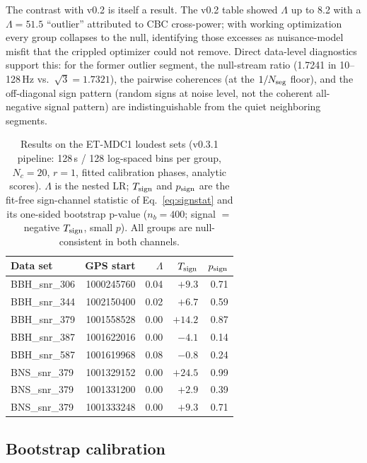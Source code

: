 \documentclass[11pt]{article}
\begin{document}
The contrast with v0.2 is itself a result. The v0.2 table showed $\Lambda$ up to 8.2 with a $\Lambda = 51.5$ ``outlier'' attributed to CBC cross-power; with working optimization every group collapses to the null, identifying those excesses as nuisance-model misfit that the crippled optimizer could not remove. Direct data-level diagnostics support this: for the former outlier segment, the null-stream ratio (1.7241 in 10--128\,Hz vs.\ $\sqrt3 = 1.7321$), the pairwise coherences (at the $1/N_{\rm seg}$ floor), and the off-diagonal sign pattern (random signs at noise level, not the coherent all-negative signal pattern) are indistinguishable from the quiet neighboring segments.

\begin{table}[t]
\centering
\caption{Results on the ET-MDC1 loudest sets (v0.3.1 pipeline: 128\,s / 128 log-spaced bins per group, $N_c = 20$, $r = 1$, fitted calibration phases, analytic scores). $\Lambda$ is the nested LR; $T_{\rm sign}$ and $p_{\rm sign}$ are the fit-free sign-channel statistic of Eq.~\eqref{eq:signstat} and its one-sided bootstrap p-value ($n_b = 400$; signal $=$ negative $T_{\rm sign}$, small $p$). All groups are null-consistent in both channels.}
\label{tab:groups}
\begin{tabular}{lrrrr}
\toprule
Data set & GPS start & $\Lambda$ & $T_{\rm sign}$ & $p_{\rm sign}$ \\
\midrule
BBH\_snr\_306 & 1000245760 & 0.04 & $+9.3$ & 0.71 \\
BBH\_snr\_344 & 1002150400 & 0.02 & $+6.7$ & 0.59 \\
BBH\_snr\_379 & 1001558528 & 0.00 & $+14.2$ & 0.87 \\
BBH\_snr\_387 & 1001622016 & 0.00 & $-4.1$ & 0.14 \\
BBH\_snr\_587 & 1001619968 & 0.08 & $-0.8$ & 0.24 \\
BNS\_snr\_379 & 1001329152 & 0.00 & $+24.5$ & 0.99 \\
BNS\_snr\_379 & 1001331200 & 0.00 & $+2.9$ & 0.39 \\
BNS\_snr\_379 & 1001333248 & 0.00 & $+9.3$ & 0.71 \\
\bottomrule
\end{tabular}
\end{table}

\subsection{Bootstrap calibration}
\label{sec:bootres}
\end{document}
